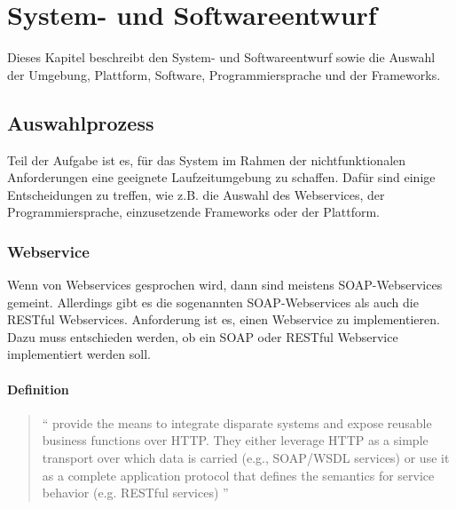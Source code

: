 \chapter{System- und Softwareentwurf} \label{kap:systemundsoftwarentwurf}


Dieses Kapitel beschreibt den System- und Softwareentwurf sowie die Auswahl der Umgebung, Plattform, Software, Programmiersprache und der Frameworks.

\section{Auswahlprozess}

Teil der Aufgabe ist es, für das System im Rahmen der nichtfunktionalen Anforderungen eine geeignete Laufzeitumgebung zu schaffen. Dafür sind einige Entscheidungen zu treffen, wie z.B. die Auswahl des Webservices, der Programmiersprache, einzusetzende Frameworks oder der Plattform. 

\subsection{Webservice}\label{sec:webservice}
Wenn von \glspl{Webservice} gesprochen wird, dann sind meistens \gls{SOAP}-\glspl{Webservice} gemeint. Allerdings gibt es die sogenannten \gls{SOAP}-\glspl{Webservice} als auch die \gls{REST}ful \glspl{Webservice}. Anforderung ist es, einen \gls{Webservice} zu implementieren. Dazu muss entschieden werden, ob ein \gls{SOAP} oder \gls{REST}ful \gls{Webservice} implementiert werden soll. 

\subsubsection{Definition}

\begin{quotation}
\enquote{ provide the means to integrate disparate systems and expose reusable business functions over \gls{HTTP}. They either leverage \gls{HTTP} as a simple transport over which data is carried (e.g., \gls{SOAP}/\gls{WSDL} services) or use it as a complete application protocol that defines the semantics for service behavior (e.g. RESTful services) \citep[S. 2][]{robinsonService}}	
\end{quotation}

